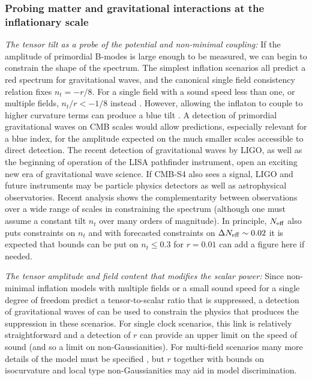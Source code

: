 \subsubsection{Probing matter and gravitational interactions at the inflationary scale}\label{subsubsec:Interactions}

{\it The tensor tilt as a probe of the potential and non-minimal coupling:} If the amplitude of primordial B-modes is large enough to be measured, we can begin to constrain the shape of the spectrum. The simplest inflation scenarios all predict a red spectrum for gravitational waves, and the canonical single field consistency relation fixes $n_t=-r/8$. For a single field with a sound speed less than one, or multiple fields, $n_t/r<-1/8$ instead \cite{Price:2014ufa}. However, allowing the inflaton to couple to higher curvature terms can produce a blue tilt \cite{Baumann:2015xxa}. A detection of primordial gravitational waves on CMB scales would allow predictions, especially relevant for a blue index, for the amplitude expected on the much smaller scales accessible to direct detection. The recent detection of gravitational waves by LIGO, as well as the beginning of operation of the LISA pathfinder instrument, open an exciting new era of gravitational wave science. If CMB-S4 also sees a signal, LIGO and future instruments may be particle physics detectors as well as astrophysical observatories. Recent analysis \cite{Meerburg:2015zua,Lasky:2015lej} shows the complementarity between observations over a wide range of scales in constraining the spectrum (although one must assume a constant tilt $n_t$ over many orders of magnitude). In principle, $N_{\rm eff}$ also puts constraints on $n_t$ \cite{Meerburg:2015zua} and with forecasted constraints on $\Delta N_{\rm eff} \sim 0.02$ it is expected that bounds can be put on $n_t \leq 0.3$ for $r = 0.01$ {\color{red} can add a figure here if needed}.  

{\it The tensor amplitude and field content that modifies the scalar power:} Since non-minimal inflation models with multiple fields or a small sound speed for a single degree of freedom predict a tensor-to-scalar ratio that is suppressed, a detection of gravitational waves of can be used to constrain the physics that produces the suppression in these scenarios. For single clock scenarios, this link is relatively straightforward \cite{Baumann:2014cja} and a detection of $r$ can provide an upper limit on the speed of sound (and so a limit on non-Gaussianities). For multi-field scenarios many more details of the model must be specified \cite{Turzynski:2014tza}, but $r$ together with bounds on isocurvature and local type non-Gaussianities may aid in model discrimination. 

